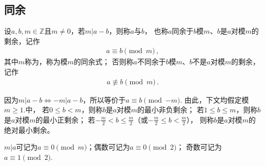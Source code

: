 \subsection*{同余}
\begin{definition}
    设$a,b,m\in\mathbb{Z}$且$m\neq0$，若$m|a-b$，则称$a$与$b$，
    也称$a$同余于$b$模$m$、$b$是$a$对模$m$的剩余，记作
    \begin{align}\label{eq:7.ex02.congruent}
        a\equiv b\pmod{m}\, ,
    \end{align}
    其中$m$称为，称为模$m$的同余式；
    否则称$a$不同余于$b$模$m$、$b$不是$a$对模$m$的剩余，记作
    \begin{align}
        a\not\equiv b\pmod{m}\, .
    \end{align}
\end{definition}

因为$m|a-b\Leftrightarrow -m|a-b$，所以等价于$a\equiv b\pmod{-m}$.
由此，下文均假定模$m\ge1$.中，
若$0\le b<m$，则称$b$是$a$对模$m$的最小非负剩余；
若$1\le b\le m$，则称$b$是$a$对模$m$的最小正剩余；
若$\displaystyle -\frac{m}{2}<b\le\frac{m}{2}$（或$\displaystyle -\frac{m}{2}\le b<\frac{m}{2}$），
则称$b$是$a$对模$m$的绝对最小剩余。
\begin{example}
    $m|a$可记为$a\equiv 0\pmod{m}$；偶数可记为$a\equiv 0\pmod{2}$；
    奇数可记为$a\equiv 1\pmod{2}$.
\end{example}



